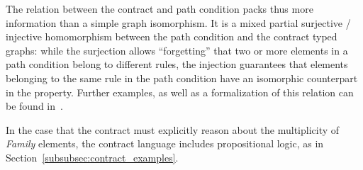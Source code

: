 The relation between the contract and path condition packs thus more
information than a simple graph isomorphism. It is a mixed partial surjective /
injective homomorphism between the path condition and the contract typed graphs:
while the surjection allows ``forgetting'' that two or more elements in a path condition belong to
different rules, the injection guarantees that elements belonging to the
same rule in the path condition have an isomorphic counterpart in the property.
Further examples, as well as a formalization of this relation can be found in~\cite{Lucio2014}.

 In the case that the contract must explicitly reason about the multiplicity of \textit{Family} elements, the contract language includes
 propositional logic, as in Section~\ref{subsubsec:contract_examples}.





 